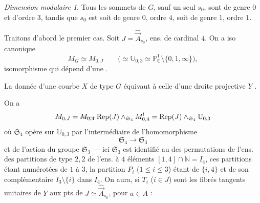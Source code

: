 \documentclass[11pt,a4paper]{article}
\begin{document}


\textit{Dimension modulaire 1}. Tous les sommets de $G$, sauf un seul $s_0$,
sont de genre $0$ et d'ordre $3$, tandis que $s_0$ est soit de genre $0$,
ordre $4$, soit de genre $1$, ordre $1$.


Traitons d'abord le premier cas. Soit $J = \hat{\vec{A}}_{s_0}$, ens. de
cardinal $4$. On a  iso canonique
\[
M_G \simeq M_{0,J}
\qquad \bigl( \simeq \mathbb{U}_{0,3} \simeq \mathbb{P}^1_{\mathbb{C}} \setminus \{0,1,\infty\} \bigr),
\]
\struck{\ill{}} isomorphisme qui dépend d'une  \ill{}.


La donnée d'une courbe $X$ de type $G$ équivaut à celle d'une 
droite projective $Y$ .

On a
\[
M_{0,J} = \text{\struck{$M_{0,4}$}}\; \mathrm{Rep}(J) \wedge_{\mathfrak{S}_4} M^{!}_{0,4}
= \mathrm{Rep}(J) \wedge_{\mathfrak{S}_4} \mathbb{U}_{0,3}
\]
où $\mathfrak{S}_4$ opère sur $\mathbb{U}_{0,3}$ par l'intermédiaire de
l'homomorphisme
\[
\mathfrak{S}_4 \longrightarrow \mathfrak{S}_3
\]
et de l'action du groupe $\mathfrak{S}_3$ — ici $\mathfrak{S}_3$ est identifié
au  \struck{\ill{}} des permutations de l'ens. des partitions de
type $2,2$ de l'ens. à $4$ éléments $[1,4] \cap \mathbb{N} = I_4$, ces
partitions étant numérotées de $1$ à $3$, la partition $P_i$
($1 \leq i \leq 3$) \struck{\ill{}} étant  de $\{i,4\}$ et de son
complémentaire \struck{\ill{}} $I_3 \setminus \{i\}$ dans $I_4$. On aura, si
$T_i$ ($i \in J$) sont les fibrés tangents unitaires de $Y$ aux pts de
$J \simeq \hat{\vec{A}}_{s_0}$, pour  $a \in A$ :
\end{document}
